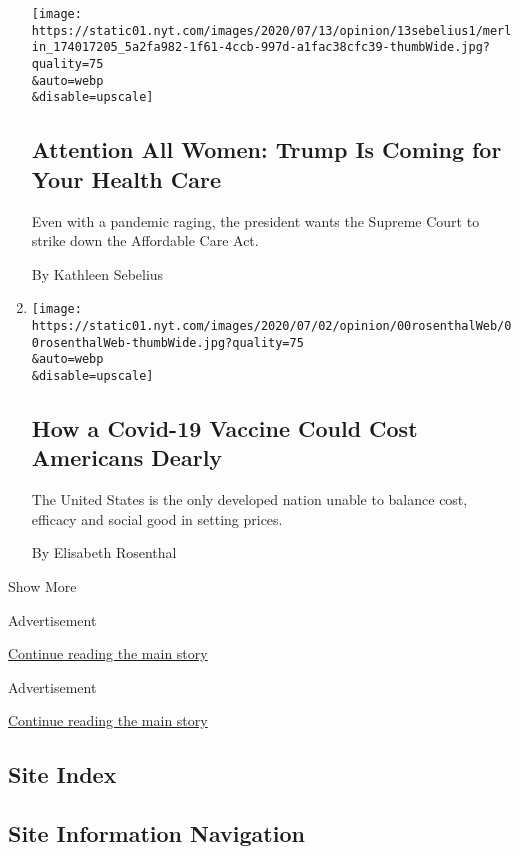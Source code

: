 \begin{enumerate}
  \texttt{[image: https://static01.nyt.com/images/2020/07/13/opinion/13sebelius1/merlin\_174017205\_5a2fa982-1f61-4ccb-997d-a1fac38cfc39-thumbWide.jpg?quality=75\\\&auto=webp\\\&disable=upscale]}

  \hypertarget{attention-all-women-trump-is-coming-for-your-health-care}{%
  \subsection{Attention All Women: Trump Is Coming for Your Health
  Care}\label{attention-all-women-trump-is-coming-for-your-health-care}}

  Even with a pandemic raging, the president wants the Supreme Court to
  strike down the Affordable Care Act.

  By Kathleen Sebelius
\item
  \href{/2020/07/06/opinion/coronavirus-vaccine-cost.html}{}

  \texttt{[image: https://static01.nyt.com/images/2020/07/02/opinion/00rosenthalWeb/00rosenthalWeb-thumbWide.jpg?quality=75\\\&auto=webp\\\&disable=upscale]}

  \hypertarget{how-a-covid-19-vaccine-could-cost-americans-dearly}{%
  \subsection{How a Covid-19 Vaccine Could Cost Americans
  Dearly}\label{how-a-covid-19-vaccine-could-cost-americans-dearly}}

  The United States is the only developed nation unable to balance cost,
  efficacy and social good in setting prices.

  By Elisabeth Rosenthal
\end{enumerate}

Show More

Advertisement

\protect\hyperlink{after-mid2}{Continue reading the main story}

Advertisement

\protect\hyperlink{after-mktg}{Continue reading the main story}

\hypertarget{site-index}{%
\subsection{Site Index}\label{site-index}}

\hypertarget{site-information-navigation}{%
\subsection{Site Information
Navigation}\label{site-information-navigation}}

